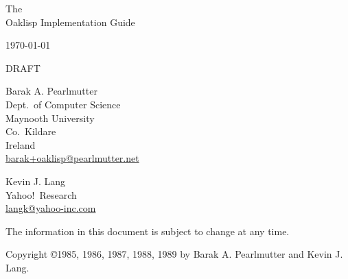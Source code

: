 %
%
%


\begin{titlepage}

\begin{center}

\vspace*{1in}

\Huge
 The \\
 Oaklisp Implementation Guide \\

\vspace{.5in}

\large
 \today \\

\vspace{.25in}

\Huge
 DRAFT \\

\vspace{.5in}

\Large
 Barak A. Pearlmutter \\
\large
 Dept.\ of Computer Science\\
 Maynooth University\\
 Co.\ Kildare\\
 Ireland\\
 \url{barak+oaklisp@pearlmutter.net}

\vspace{.5in}

\Large
 Kevin J. Lang \\
\large
 Yahoo!\ Research \\
 \url{langk@yahoo-inc.com}

\vfill

\vspace{0.25in}

 The information in this document is subject to change at any time.

\end{center}

\end{titlepage}


\thispagestyle{empty}

\vspace*{6in}

\normalsize
\noindent Copyright \copyright 1985, 1986, 1987, 1988, 1989
 by Barak A. Pearlmutter and Kevin J. Lang.


\newpage



